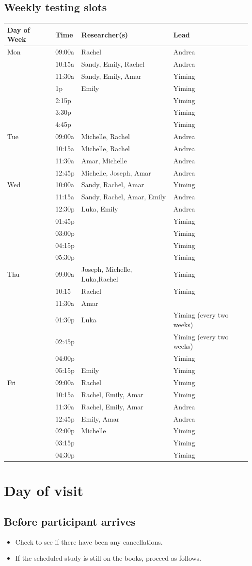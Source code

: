 \documentclass[]{article}
\providecommand{\tightlist}{%
  \setlength{\itemsep}{0pt}\setlength{\parskip}{0pt}}
\begin{document}
\subsection{Weekly testing slots}\label{weekly-testing-slots}

\begin{longtable}[]{@{}llll@{}}
\toprule
Day of Week & Time & Researcher(s) & Lead\tabularnewline
\midrule
\endhead
Mon & 09:00a & Rachel & Andrea\tabularnewline
& 10:15a & Sandy, Emily, Rachel & Andrea\tabularnewline
& 11:30a & Sandy, Emily, Amar & Yiming\tabularnewline
& 1p & Emily & Yiming\tabularnewline
& 2:15p & & Yiming\tabularnewline
& 3:30p & & Yiming\tabularnewline
& 4:45p & & Yiming\tabularnewline
Tue & 09:00a & Michelle, Rachel & Andrea\tabularnewline
& 10:15a & Michelle, Rachel & Andrea\tabularnewline
& 11:30a & Amar, Michelle & Andrea\tabularnewline
& 12:45p & Michelle, Joseph, Amar & Andrea\tabularnewline
Wed & 10:00a & Sandy, Rachel, Amar & Yiming\tabularnewline
& 11:15a & Sandy, Rachel, Amar, Emily & Andrea\tabularnewline
& 12:30p & Luka, Emily & Andrea\tabularnewline
& 01:45p & & Yiming\tabularnewline
& 03:00p & & Yiming\tabularnewline
& 04:15p & & Yiming\tabularnewline
& 05:30p & & Yiming\tabularnewline
Thu & 09:00a & Joseph, Michelle, Luka,Rachel & Yiming\tabularnewline
& 10:15 & Rachel & Yiming\tabularnewline
& 11:30a & Amar &\tabularnewline
& 01:30p & Luka & Yiming (every two weeks)\tabularnewline
& 02:45p & & Yiming (every two weeks)\tabularnewline
& 04:00p & & Yiming\tabularnewline
& 05:15p & Emily & Yiming\tabularnewline
Fri & 09:00a & Rachel & Yiming\tabularnewline
& 10:15a & Rachel, Emily, Amar & Yiming\tabularnewline
& 11:30a & Rachel, Emily, Amar & Andrea\tabularnewline
& 12:45p & Emily, Amar & Andrea\tabularnewline
& 02:00p & Michelle & Yiming\tabularnewline
& 03:15p & & Yiming\tabularnewline
& 04:30p & & Yiming\tabularnewline
\bottomrule
\end{longtable}

\section{Day of visit}\label{day-of-visit}

\subsection{Before participant
arrives}\label{before-participant-arrives}

\begin{itemize}
\tightlist
\item
  Check to see if there have been any cancellations.
\item
  If the scheduled study is still on the books, proceed as follows.
\end{itemize}
\end{document}
